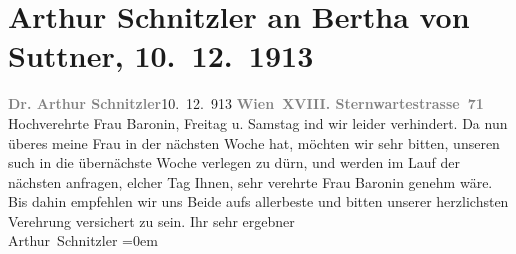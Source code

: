 

               \section[Arthur Schnitzler an Bertha von Suttner, 10. 12. 1913]{ Arthur Schnitzler an Bertha von Suttner,
                    10. 12. 1913}\nopagebreak{}\rehead{ }\begin{ledgroupsized}[t]{13cm}\normalsize\beginnumbering{} \toendnotes[C]{\smallbreak\pagebreak[2]} 
\toendnotes[C]{\smallbreak}\pstart
           \noindent{}{\pb}\textcolor{gray}{\textbf{Dr. Arthur Schnitzler}}\hfill 10. 12. 913\pend
           \pstart
           \textcolor{gray}{\textbf{Wien XVIII. Sternwartestrasse 71}}\pend
           \pstart
           Hochverehrte Frau Baronin, Freitag u. Samstag{ }ind wir leider verhindert. Da nun überes meine Frau in
                    der nächsten Woche \label{K_L02162_1v}\label{K_L02162_1h} hat, möchten wir sehr bitten, unseren such in die übernächste Woche verlegen zu dürn, und werden im Lauf der nächsten anfragen, elcher Tag Ihnen, sehr verehrte Frau Baronin {\pb}genehm wäre.\pend
           \pstart
           Bis dahin empfehlen wir uns Beide aufs allerbeste und bitten unserer herzlichsten Verehrung
                    versichert zu sein.\pend
           \pstart
           Ihr sehr ergebner{\\[\baselineskip]}\spacefill\mbox{Arthur Schnitzler}\pend
           \leftskip=0em{}\endnumbering{}\end{ledgroupsized}  \newcommand{\dateiname}{L02162}\newcommand{\titel}{Arthur Schnitzler an Bertha von Suttner, 10. 12. 1913}\newcommand{\editorInnen}{Martin Anton Müller und Gerd-Hermann Susen}
      